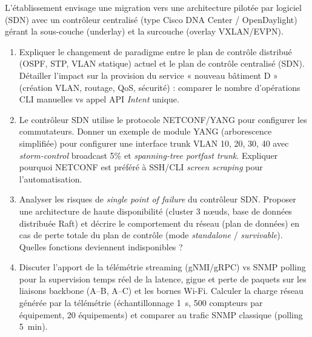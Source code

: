 \documentclass[11pt]{article}
\begin{document}
\begin{exercice}
L'établissement envisage une migration vers une architecture pilotée par logiciel (SDN) avec un contrôleur centralisé (type Cisco DNA Center / OpenDaylight) gérant la sous-couche (underlay) et la surcouche (overlay VXLAN/EVPN).
\begin{enumerate}
    \item Expliquer le changement de paradigme entre le plan de contrôle distribué (OSPF, STP, VLAN statique) actuel et le plan de contrôle centralisé (SDN). Détailler l'impact sur la provision du service « nouveau bâtiment D » (création VLAN, routage, QoS, sécurité) : comparer le nombre d'opérations CLI manuelles vs appel API \textit{Intent} unique.
    \item Le contrôleur SDN utilise le protocole NETCONF/YANG pour configurer les commutateurs. Donner un exemple de module YANG (arborescence simplifiée) pour configurer une interface trunk VLAN 10, 20, 30, 40 avec \textit{storm-control} broadcast 5\% et \textit{spanning-tree portfast trunk}. Expliquer pourquoi NETCONF est préféré à SSH/CLI \textit{screen scraping} pour l'automatisation.
    \item Analyser les risques de \textit{single point of failure} du contrôleur SDN. Proposer une architecture de haute disponibilité (cluster 3 nœuds, base de données distribuée Raft) et décrire le comportement du réseau (plan de données) en cas de perte totale du plan de contrôle (mode \textit{standalone} / \textit{survivable}). Quelles fonctions deviennent indisponibles ?
    \item Discuter l'apport de la télémétrie streaming (gNMI/gRPC) vs SNMP polling pour la supervision temps réel de la latence, gigue et perte de paquets sur les liaisons backbone (A--B, A--C) et les bornes Wi-Fi. Calculer la charge réseau générée par la télémétrie (échantillonnage \SI{1}{\second}, 500 compteurs par équipement, 20 équipements) et comparer au trafic SNMP classique (polling \SI{5}{\minute}).
\end{enumerate}
\end{exercice}
\end{document}
